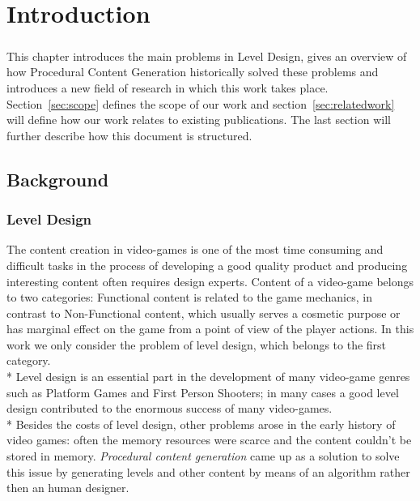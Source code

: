 \chapter{Introduction}
\paragraph{} This chapter introduces the main problems in Level Design, gives an overview of how Procedural Content Generation historically solved these problems and introduces a new field of research in which this work takes place. Section~\ref{sec:scope} defines the scope of our work and section~\ref{sec:relatedwork} will define how our work relates to existing publications. The last section will further describe how this document is structured.

\section{Background}
\subsection{Level Design}
The content creation in video-games is one of the most time consuming and difficult tasks in the process of developing a good quality product and producing interesting content often requires design experts. Content of a video-game belongs to two categories: Functional content is related to the game mechanics, in contrast to Non-Functional content, which usually serves a cosmetic purpose or has marginal effect on the game from a point of view of the player actions. In this work we only consider the problem of level design, which belongs to the first category. \\*
Level design is an essential part in the development of many video-game genres such as Platform Games and First Person Shooters; in many cases a good level design contributed to the enormous success of many video-games. \\*
Besides the costs of level design, other problems arose in the early history of video games: often the memory resources were scarce and the content couldn't be stored in memory. \textit{Procedural content generation} came up as a solution to solve this issue by generating levels and other content by means of an algorithm rather then an human designer.

